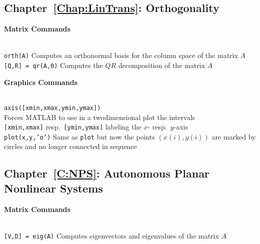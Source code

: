 \documentclass{ximera}
\begin{document}
\subsection*{Chapter~\ref{Chap:LinTrans}: Orthogonality}


\centerline{
{\bf Matrix Commands}
} \vspace*{-0.1in}
 
\begin{tabbing}
 \hspace{1.3in} \= \\

     {\tt orth(A)}   \>
 Computes an orthonormal basis for the column space
		of the matrix $A$ \\ 
     {\tt [Q,R] = qr(A,0)}   \>
 Computes the $QR$ decomposition of the matrix $A$

\end{tabbing}
 
\centerline{
{\bf Graphics Commands}
} \vspace*{-0.1in}
 
\begin{tabbing}
 \hspace{1.2in} \= \\

     {\tt axis([xmin,xmax,ymin,ymax])}  \> \\
 \> Forces MATLAB to use in a twodimensional plot the intervals \\
 \> {\tt [xmin,xmax]} resp.\ {\tt [ymin,ymax]}
    labeling the $x$- resp.\ $y$-axis \\

     {\tt plot(x,y,'o')}   \>
 Same as {\tt plot} but now the points $(x(i),y(i))$
	are marked by \\ \> circles and no longer connected in 
	sequence
\end{tabbing} 

\subsection*{Chapter~\ref{C:NPS}: Autonomous Planar Nonlinear Systems}

\centerline{
{\bf Matrix Commands}
} \vspace*{-0.1in}
 
\begin{tabbing}
 \hspace{1.2in} \= \\
     {\tt [V,D] = eig(A)}   \>
 Computes eigenvectors and eigenvalues of the 
			matrix $A$ 
\end{tabbing}
\end{document}
